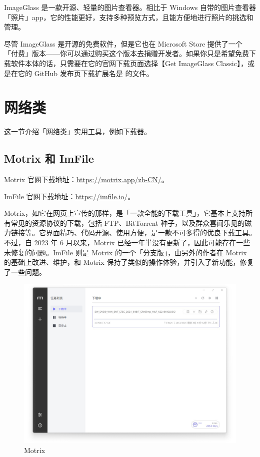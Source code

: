 ImageGlass 是一款开源、轻量的图片查看器。相比于 Windows 自带的图片查看器「照片」app，它的性能更好，支持多种预览方式，且能方便地进行照片的挑选和管理。

尽管 ImageGlass 是开源的免费软件，但是它也在 Microsoft Store 提供了一个「付费」版本——你可以通过购买这个版本去捐赠开发者。如果你只是希望免费下载软件本体的话，只需要在它的官网下载页面选择【Get ImageGlass Classic】，或是在它的 GitHub 发布页下载扩展名是  的文件。

\section{网络类}

这一节介绍「网络类」实用工具，例如下载器。

\subsection{Motrix 和 ImFile}

Motrix 官网下载地址：\url{https://motrix.app/zh-CN/}。

ImFile 官网下载地址：\url{https://imfile.io/}。

Motrix，如它在网页上宣传的那样，是「一款全能的下载工具」，它基本上支持所有常见的资源协议的下载，包括 FTP、BitTorrent 种子，以及群众喜闻乐见的磁力链接等。它界面精巧、代码开源、使用方便，是一款不可多得的优良下载工具。不过，自 2023 年 6 月以来，Motrix 已经一年半没有更新了，因此可能存在一些未修复的问题。ImFile 则是 Motrix 的一个「分支版」，由另外的作者在 Motrix 的基础上改进、维护，和 Motrix 保持了类似的操作体验，并引入了新功能，修复了一些问题。

\begin{figure}[htb!]
  \centering
  \includegraphics[width=.6\textwidth]{assets/software/Motrix.png}
  \caption{Motrix}
  \label{fig:Motrix}
\end{figure}

